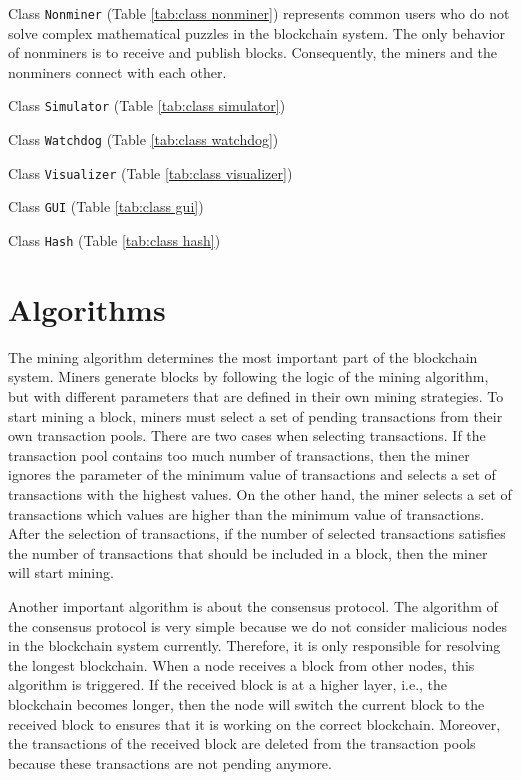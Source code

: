 Class \texttt{Nonminer} (Table \ref{tab:class nonminer}) represents common users who do not solve complex mathematical puzzles in the blockchain system. The only behavior of nonminers is to receive and publish blocks. Consequently, the miners and the nonminers connect with each other. 

Class \texttt{Simulator} (Table \ref{tab:class simulator}) 

Class \texttt{Watchdog} (Table \ref{tab:class watchdog}) 

Class \texttt{Visualizer} (Table \ref{tab:class visualizer}) 

Class \texttt{GUI} (Table \ref{tab:class gui}) 

Class \texttt{Hash} (Table \ref{tab:class hash}) 

\section{Algorithms}
\label{algorithms}

The mining algorithm determines the most important part of the blockchain system. Miners generate blocks by following the logic of the mining algorithm, but with different parameters that are defined in their own mining strategies. To start mining a block, miners must select a set of pending transactions from their own transaction pools. There are two cases when selecting transactions. If the transaction pool contains too much number of transactions, then the miner ignores the parameter of the minimum value of transactions and selects a set of transactions with the highest values. On the other hand, the miner selects a set of transactions which values are higher than the minimum value of transactions. After the selection of transactions, if the number of selected transactions satisfies the number of transactions that should be included in a block, then the miner will start mining.

Another important algorithm is about the consensus protocol. The algorithm of the consensus protocol is very simple because we do not consider malicious nodes in the blockchain system currently. Therefore, it is only responsible for resolving the longest blockchain. When a node receives a block from other nodes, this algorithm is triggered. If the received block is at a higher layer, i.e., the blockchain becomes longer, then the node will switch the current block to the received block to ensures that it is working on the correct blockchain. Moreover, the transactions of the received block are deleted from the transaction pools because these transactions are not pending anymore.

